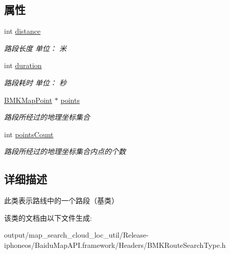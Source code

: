 \subsection*{属性}
\begin{DoxyCompactItemize}
\item 
\hypertarget{interface_b_m_k_route_step_a868b7ecc4313b1c1824a80199012c877}{}int \hyperlink{interface_b_m_k_route_step_a868b7ecc4313b1c1824a80199012c877}{distance}\label{interface_b_m_k_route_step_a868b7ecc4313b1c1824a80199012c877}

\begin{DoxyCompactList}\small\item\em 路段长度 单位： 米 \end{DoxyCompactList}\item 
\hypertarget{interface_b_m_k_route_step_a9c191d3389a169c46e76fb432926855d}{}int \hyperlink{interface_b_m_k_route_step_a9c191d3389a169c46e76fb432926855d}{duration}\label{interface_b_m_k_route_step_a9c191d3389a169c46e76fb432926855d}

\begin{DoxyCompactList}\small\item\em 路段耗时 单位： 秒 \end{DoxyCompactList}\item 
\hypertarget{interface_b_m_k_route_step_aa2faec42865f6254da77039a0729bb6b}{}\hyperlink{struct_b_m_k_map_point}{B\+M\+K\+Map\+Point} $\ast$ \hyperlink{interface_b_m_k_route_step_aa2faec42865f6254da77039a0729bb6b}{points}\label{interface_b_m_k_route_step_aa2faec42865f6254da77039a0729bb6b}

\begin{DoxyCompactList}\small\item\em 路段所经过的地理坐标集合 \end{DoxyCompactList}\item 
\hypertarget{interface_b_m_k_route_step_a58902517ed7dc89918d9b4b9a02dbafa}{}int \hyperlink{interface_b_m_k_route_step_a58902517ed7dc89918d9b4b9a02dbafa}{points\+Count}\label{interface_b_m_k_route_step_a58902517ed7dc89918d9b4b9a02dbafa}

\begin{DoxyCompactList}\small\item\em 路段所经过的地理坐标集合内点的个数 \end{DoxyCompactList}\end{DoxyCompactItemize}


\subsection{详细描述}
此类表示路线中的一个路段（基类） 

该类的文档由以下文件生成\+:\begin{DoxyCompactItemize}
\item 
output/map\+\_\+search\+\_\+cloud\+\_\+loc\+\_\+util/\+Release-\/iphoneos/\+Baidu\+Map\+A\+P\+I.\+framework/\+Headers/B\+M\+K\+Route\+Search\+Type.\+h\end{DoxyCompactItemize}
